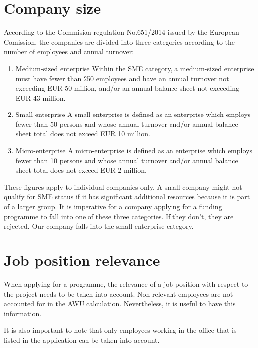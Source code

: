 \documentclass[12pt,oneside]{fithesis2}
\begin{document}
\section{Company size}
\noindent
According to the Commision regulation No.651/2014 \cite[page~70]{eu-commision-regulation} issued by the European Comission, the companies are divided into three categories according to the number of employees and annual turnover:
\begin{enumerate}
    \item Medium-sized enterprise
    \newline\newline
    Within the SME category, a medium-sized enterprise must have fewer than 250 employees and have an annual turnover not exceeding EUR 50 million, and/or an annual balance sheet not exceeding EUR 43 million.
    \item Small enterprise
    \newline\newline
    A small enterprise is defined as an enterprise which employs fewer than 50 persons and whose annual turnover and/or annual balance sheet total does not exceed EUR 10 million.
    \item Micro-enterprise
    \newline\newline
    A micro-enterprise is defined as an enterprise which employs fewer than 10 persons and whose annual turnover and/or annual balance sheet total does not exceed EUR 2 million.
\end{enumerate}
These figures apply to individual companies only. A small company might not qualify for SME status if it has significant additional resources because it is part of a larger group. \cite{eu-commision-regulation}
It is imperative for a company applying for a funding programme to fall into one of these three categories. If they don't, they are rejected. Our company falls into the small enterprise category.
\section{Job position relevance}
When applying for a programme, the relevance of a job position with respect to the project needs to be taken into account. Non-relevant employees are not accounted for in the AWU calculation. Nevertheless, it is useful to have this information.

It is also important to note that only employees working in the office that is listed in the application can be taken into account.\cite[page~30]{czech-rules}
\end{document}
